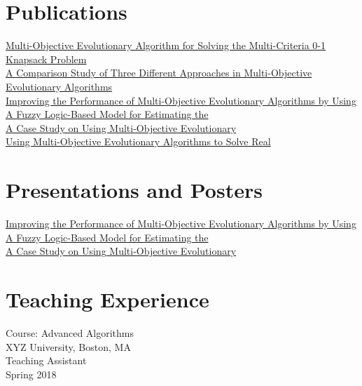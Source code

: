 \documentclass[10pt]{article}
\begin{document}
\section{Publications}
\href{https://www.researchgate.net/publication/268145791_A_Multi-Objective_Evolutionary_Algorithm_for_Solving_the_Multi-Criteria_0-1_Knapsack_Problem}{Multi-Objective Evolutionary Algorithm for Solving the Multi-Criteria 0-1 Knapsack Problem} \\
\href{https://www.researchgate.net/publication/268145793_A_Comparison_Study_of_Three_Different_Approaches_in_Multi-Objective_Evolutionary_Algorithms}{A Comparison Study of Three Different Approaches in Multi-Objective Evolutionary Algorithms} \\
\href{https://www.researchgate.net/publication/268145790_Improving_the_Performance_of_Multi-Objective_Evolutionary_Algorithms_by_Using}{Improving the Performance of Multi-Objective Evolutionary Algorithms by Using} \\
\href{https://www.researchgate.net/publication/268145789_A_Fuzzy_Logic_Based_Model_for_Estimating_the}{A Fuzzy Logic-Based Model for Estimating the} \\
\href{https://www.researchgate.net/publication/268145773_A_Case_Study_on_Using_Multi-Objective_Evolutionary}{A Case Study on Using Multi-Objective Evolutionary} \\
\href{https://www.researchgate.net/publication/268145781_Using_Multi-Objective_Evolutionary_Algorithms_to_Solve_Real}{Using Multi-Objective Evolutionary Algorithms to Solve Real}

\section{Presentations and Posters}
\href{https://www.researchgate.net/publication/268145790_Improving_the_Performance_of_Multi-Objective_Evolutionary_Algorithms_by_Using}{Improving the Performance of Multi-Objective Evolutionary Algorithms by Using} \\
\href{https://www.researchgate.net/publication/268145789_A_Fuzzy_Logic_Based_Model_for_Estimating_the}{A Fuzzy Logic-Based Model for Estimating the} \\
\href{https://www.researchgate.net/publication/268145773_A_Case_Study_on_Using_Multi-Objective_Evolutionary}{A Case Study on Using Multi-Objective Evolutionary}

\section{Teaching Experience}
Course: Advanced Algorithms \\
XYZ University, Boston, MA \\
Teaching Assistant \\
Spring 2018
\end{document}
